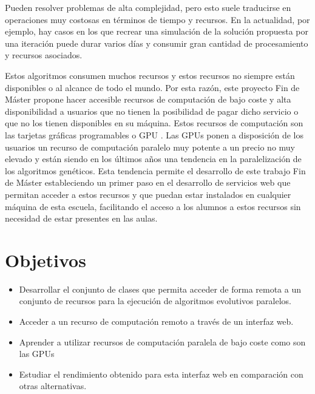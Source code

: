 \bigskip
Pueden resolver problemas de alta complejidad, pero esto suele traducirse en operaciones muy costosas en términos de tiempo y recursos. En la actualidad, por ejemplo, hay casos en los que recrear una simulación de la solución propuesta por una iteración puede durar varios días y consumir gran cantidad de procesamiento y recursos asociados.


\bigskip
Estos algoritmos consumen muchos recursos y estos recursos no siempre están disponibles o al alcance de todo el mundo. Por esta razón, este proyecto Fin de Máster propone hacer accesible recursos de computación de bajo coste y alta disponibilidad a usuarios que no tienen la posibilidad de pagar dicho servicio o que no los tienen disponibles en su máquina. Estos recursos de computación son las tarjetas gráficas programables o GPU \cite{gpgpu}. Las GPUs ponen a disposición de los usuarios un recurso de computación paralelo muy potente a un precio no muy elevado y están siendo en los últimos años una tendencia en la paralelización de los algoritmos genéticos. Esta tendencia permite el desarrollo de este trabajo Fin de Máster estableciendo un primer paso en el desarrollo de servicios web que permitan acceder a estos recursos y que puedan estar instalados en cualquier máquina de esta escuela, facilitando el acceso a los alumnos a estos recursos sin necesidad de estar presentes en las aulas.



\bigskip
\section{Objetivos}
\bigskip


\begin{itemize}
	
	\item  Desarrollar el conjunto de clases que permita acceder de forma remota a un conjunto de recursos para la ejecución de algoritmos evolutivos paralelos.
	\item  Acceder a un recurso de computación remoto a través de un interfaz web.
	\item  Aprender a utilizar recursos de computación paralela de bajo coste como son las GPUs
	\item  Estudiar el rendimiento obtenido para esta interfaz web en comparación con otras alternativas.
	
\end{itemize}



\bigskip
